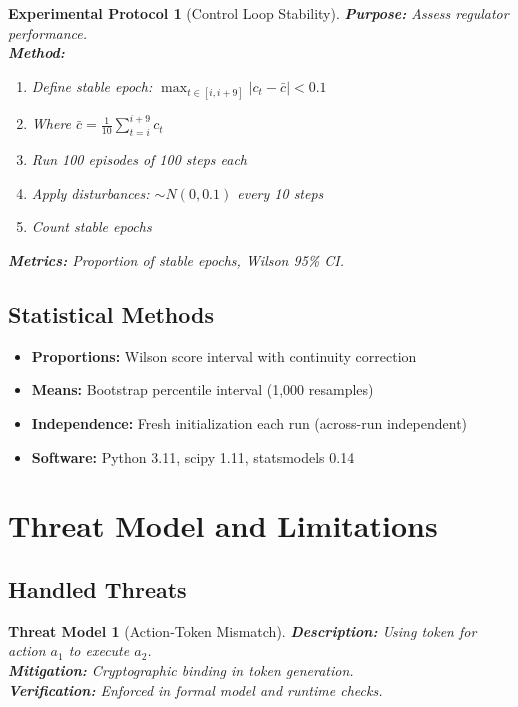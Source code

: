 \documentclass[12pt]{article}
\newtheorem{experiment}{Experimental Protocol}[section]
\newtheorem{threat}{Threat Model}[section]
\begin{document}
\begin{experiment}[Control Loop Stability]
\textbf{Purpose:} Assess regulator performance.\\
\textbf{Method:}
\begin{enumerate}
    \item Define stable epoch: $\max_{t \in [i,i+9]} |c_t - \bar{c}| < 0.1$
    \item Where $\bar{c} = \frac{1}{10}\sum_{t=i}^{i+9} c_t$
    \item Run 100 episodes of 100 steps each
    \item Apply disturbances: $\sim N(0, 0.1)$ every 10 steps
    \item Count stable epochs
\end{enumerate}
\textbf{Metrics:} Proportion of stable epochs, Wilson 95\% CI.
\end{experiment}

\subsection{Statistical Methods}

\begin{itemize}
    \item \textbf{Proportions:} Wilson score interval with continuity correction
    \item \textbf{Means:} Bootstrap percentile interval (1,000 resamples)
    \item \textbf{Independence:} Fresh initialization each run (across-run independent)
    \item \textbf{Software:} Python 3.11, scipy 1.11, statsmodels 0.14
\end{itemize}

\section{Threat Model and Limitations}

\subsection{Handled Threats}

\begin{threat}[Action-Token Mismatch]
\textbf{Description:} Using token for action $a_1$ to execute $a_2$.\\
\textbf{Mitigation:} Cryptographic binding in token generation.\\
\textbf{Verification:} Enforced in formal model and runtime checks.
\end{threat}
\end{document}
